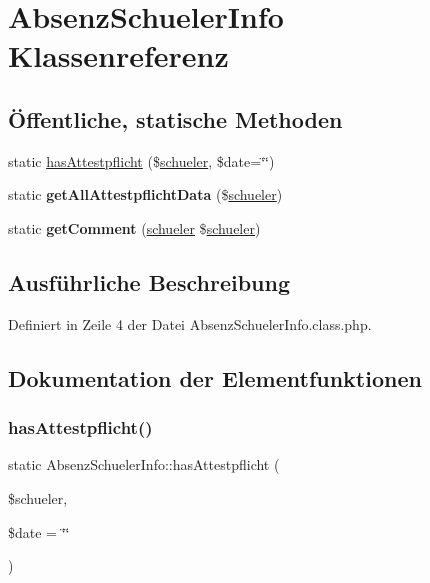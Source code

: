 \hypertarget{class_absenz_schueler_info}{}\section{Absenz\+Schueler\+Info Klassenreferenz}
\label{class_absenz_schueler_info}
\subsection*{Öffentliche, statische Methoden}
\begin{DoxyCompactItemize}
\item 
static \mbox{\hyperlink{class_absenz_schueler_info_a521aba03ed50b0600e86db4c6ae4e6f7}{has\+Attestpflicht}} (\$\mbox{\hyperlink{classschueler}{schueler}}, \$date=\char`\"{}\char`\"{})
\item 
\mbox{\label{class_absenz_schueler_info_aff9f33e569efe9ba0c290ac61fa52bba}} 
static {\bfseries get\+All\+Attestpflicht\+Data} (\$\mbox{\hyperlink{classschueler}{schueler}})
\item 
\mbox{\label{class_absenz_schueler_info_af276ab368d361216796c19b98ad49863}} 
static {\bfseries get\+Comment} (\mbox{\hyperlink{classschueler}{schueler}} \$\mbox{\hyperlink{classschueler}{schueler}})
\end{DoxyCompactItemize}


\subsection{Ausführliche Beschreibung}


Definiert in Zeile 4 der Datei Absenz\+Schueler\+Info.\+class.\+php.



\subsection{Dokumentation der Elementfunktionen}
\mbox{\label{class_absenz_schueler_info_a521aba03ed50b0600e86db4c6ae4e6f7}} 
\subsubsection{\texorpdfstring{has\+Attestpflicht()}{hasAttestpflicht()}}
{\footnotesize\ttfamily static Absenz\+Schueler\+Info\+::has\+Attestpflicht (\begin{DoxyParamCaption}\item[{}]{\$schueler,  }\item[{}]{\$date = {\ttfamily \char`\"{}\char`\"{}} }\end{DoxyParamCaption})\hspace{0.3cm}{\ttfamily [static]}}

